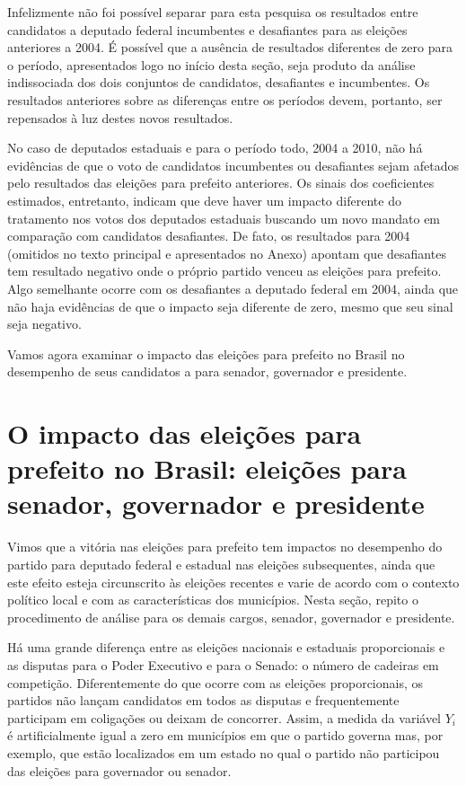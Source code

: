 Infelizmente não foi possível separar para esta pesquisa os resultados entre candidatos a deputado federal incumbentes e desafiantes para as eleições anteriores a 2004. É possível que a ausência de resultados diferentes de zero para o período, apresentados logo no início desta seção, seja produto da análise indissociada dos dois conjuntos de candidatos, desafiantes e incumbentes. Os resultados anteriores sobre as diferenças entre os períodos devem, portanto, ser repensados à luz destes novos resultados.

No caso de deputados estaduais e para o período todo, 2004 a 2010, não há evidências de que o voto de candidatos incumbentes ou desafiantes sejam afetados pelo resultados das eleições para prefeito anteriores. Os sinais dos coeficientes estimados, entretanto, indicam que deve haver um impacto diferente do tratamento nos votos dos deputados estaduais buscando um novo mandato em comparação com candidatos desafiantes. De fato, os resultados para 2004 (omitidos no texto principal e apresentados no Anexo) apontam que desafiantes tem resultado negativo onde o próprio partido venceu as eleições para prefeito. Algo semelhante ocorre com os desafiantes a deputado federal em 2004, ainda que não haja evidências de que o impacto seja diferente de zero, mesmo que seu sinal seja negativo.

Vamos agora examinar o impacto das eleições para prefeito no Brasil no desempenho de seus candidatos a para senador, governador e presidente.

\section{O impacto das eleições para prefeito no Brasil: eleições para senador, governador e presidente}

Vimos que a vitória nas eleições para prefeito tem impactos no desempenho do partido para deputado federal e estadual nas eleições subsequentes, ainda que este efeito esteja circunscrito às eleições recentes e varie de acordo com o contexto político local e com as características dos municípios. Nesta seção, repito o procedimento de análise para os demais cargos, senador, governador e presidente.

Há uma grande diferença entre as eleições nacionais e estaduais proporcionais e as disputas para o Poder Executivo e para o Senado: o número de cadeiras em competição. Diferentemente do que ocorre com as eleições proporcionais, os partidos não lançam candidatos em todos as disputas e frequentemente participam em coligações ou deixam de concorrer. Assim, a medida da variável $Y_{i}$ é artificialmente igual a zero em municípios em que o partido governa mas, por exemplo, que estão localizados em um estado no qual o partido não participou das eleições para governador ou senador.

